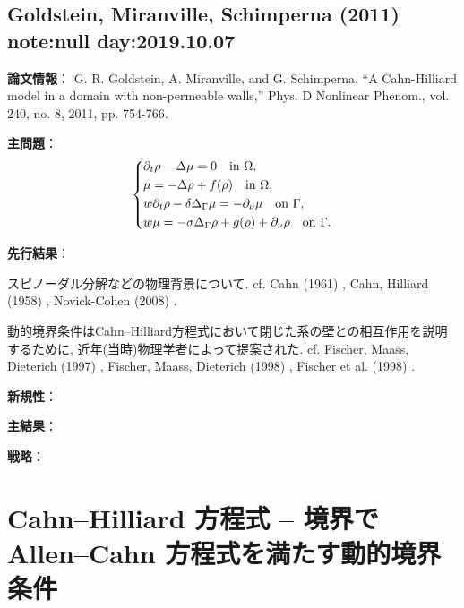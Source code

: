 \documentclass[a4paper]{article}
\begin{document}
\newpage

\subsection{Goldstein, Miranville, Schimperna (2011) \cite{GoldsteinMiranvilleSchimperna2011} note:null day:2019.10.07}
{\bf 論文情報}：
G. R. Goldstein, A. Miranville, and G. Schimperna, “A Cahn-Hilliard model in a domain with non-permeable walls,” Phys. D Nonlinear Phenom., vol. 240, no. 8, 2011, pp. 754-766.

{\bf 主問題}：
\begin{equation}\left\{\begin{aligned}
	&\partial_t\rho - \Delta\mu = 0\quad\text{in }\Omega,\\
	&\mu = -\Delta\rho + f(\rho)\quad\text{in }\Omega,\\
	&w\partial_t\rho - \delta \Delta_{\Gamma}\mu = -\partial_{\nu}\mu\quad\text{on }\Gamma,\\
	&w\mu = -\sigma\Delta_{\Gamma}\rho + g(\rho) + \partial_{\nu}\rho\quad\text{on }\Gamma.
\end{aligned}\right.\end{equation}


{\bf 先行結果}：

スピノーダル分解などの物理背景について.
cf. Cahn (1961) \cite{Cahn1961}, Cahn, Hilliard (1958) \cite{CahnHilliard1958}, Novick-Cohen (2008) \cite{NovickCohen2008}.

動的境界条件はCahn--Hilliard方程式において閉じた系の壁との相互作用を説明するために, 近年(当時)物理学者によって提案された.
cf. Fischer, Maass, Dieterich (1997) \cite{FixcherMaassDieterich1997}, Fischer, Maass, Dieterich (1998) \cite{FixcherMaassDieterich1998}, Fischer et al. (1998) \cite{FischerETAL1998}.

{\bf 新規性}：

{\bf 主結果}：

{\bf 戦略}：




\newpage

\section{Cahn--Hilliard 方程式 -- 境界で Allen--Cahn 方程式を満たす動的境界条件}
\end{document}
